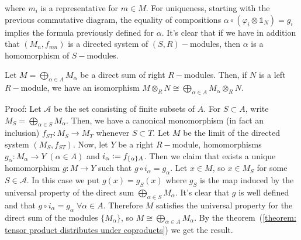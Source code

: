 where $m_i$ is a representative for $m\in M$. For uniqueness, starting with the previous commutative diagram, the equality of compositions $\alpha\circ(\varphi_i\otimes\mathds{1}_N)=g_i$ implies the formula previously defined for $\alpha$. It's clear that if  we have in addition that $(M_n, f_{mn})$ is a directed system of $(S,R)-$modules, then $\alpha$ is a homomorphism of $S-$modules.
\begin{dang}
    \begin{theorem}\label{corollary: tensor distributes over infinite coproducts}
        Let $M=\bigoplus_{\alpha\in A}M_\alpha$ be a direct sum of right $R-$modules. Then, if $N$ is a left $R-$module, we have an isomorphism $M\otimes_R N\cong \bigoplus_{\alpha \in A}M_\alpha\otimes_RN$.
    \end{theorem}
\end{dang}
Proof: Let $\mathcal{A}$ be the set consisting of finite subsets of $A$. For $S\subset A$, write $M_S=\bigoplus_{\alpha\in S}M_\alpha$. Then, we have a canonical monomorphism (in fact an inclusion) $f_{ST}:M_S\rightarrow M_T$ whenever $S\subset T$. Let $M$ be the limit of the directed system $(M_S, f_{ST})$. Now, let $Y$ be a right $R-$module, homomorphisms $g_\alpha: M_\alpha \rightarrow Y\;(\alpha\in A)$ and $i_\alpha\bydef f_{\{\alpha\}A}$. Then we claim that exists a unique homomorphism $g: M\rightarrow Y$ such that $g\circ i_\alpha = g_\alpha$. Let $x\in M$, so $x\in M_S$ for some $S\in\mathcal{A}$. In this case we put $g(x)=g_S(x)$ where $g_S$ is the map induced by the universal property of the direct sum $\bigoplus_{\alpha\in S}M_\alpha$. It's clear that $g$ is well defined and that $g\circ i_\alpha =g_\alpha\;\forall\alpha\in A$. Therefore $M$ satisfies the universal property for the direct sum of the modules $\{M_\alpha\}$, so $M\cong \bigoplus_{\alpha\in A}M_\alpha$. By the theorem~(\ref{theorem: tensor product distributes under coproducts}) we get the result.




